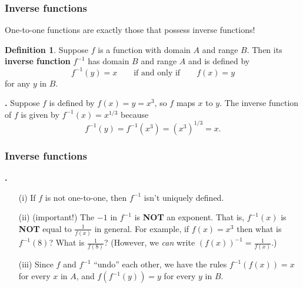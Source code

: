 \documentclass[t]{beamer}
\theoremstyle{plain}
\theoremstyle{definition}
\newtheorem{dfn}{Definition}
\newcounter{heading}
\newcommand{\newhead}[1]{\medskip\stepcounter{heading}\noindent\textbf{\hspace{0.2cm}{#1}.}}
\begin{document}
\begin{frame}
\frametitle{Inverse functions}
\noindent One-to-one functions are exactly those that possess inverse functions! \pause

\begin{dfn} Suppose $f$ is a function with domain $A$ and range $B$.  Then its \textbf{inverse function} $f^{-1}$ has domain $B$ and range $A$ and is defined by 
\[ f^{-1}(y) = x \qquad \text{if and only if} \qquad f(x) = y\]
for any $y$ in $B$.\end{dfn} \pause



\newhead{Example} Suppose $f$ is defined by $f(x) = y = x^{3}$, so $f$ maps $x$ to $y$.  The inverse function of $f$ is given by $f^{-1}(x) = x^{1/3}$ because  
\[ f^{-1}(y) = f^{-1}(x^{3}) = (x^{3})^{1/3} = x.\]
\end{frame}

\begin{frame}
\frametitle{Inverse functions}
\newhead{Remarks}
\begin{enumerate}[<+->]
\item[(i)] If $f$ is not one-to-one, then $f^{-1}$ isn't uniquely defined.

\item[(ii)] (important!) The $-1$ in $f^{-1}$ is \textbf{NOT} an exponent.  That is, $f^{-1}(x)$ is \textbf{NOT} equal to $\frac{1}{f(x)}$ in general.  For example, if $f(x) = x^{3}$ then what is $f^{-1}(8)$?  What is $\frac{1}{f(8)}$?  (However, we \emph{can} write $(f(x))^{-1} = \frac{1}{f(x)}$.)

\item[(iii)] Since $f$ and $f^{-1}$ ``undo''  each other, we have the rules $f^{-1}(f(x)) = x$ for every $x$ in $A$, and $f(f^{-1}(y)) = y$ for every $y$ in $B$.  

\end{enumerate}

\vspace*{.2cm}

\end{frame}
\end{document}
